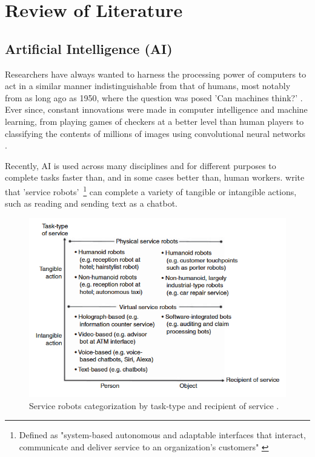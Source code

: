 \documentclass[12pt]{report}
\begin{document}
    \pagebreak %

    \section{Review of Literature}

    \subsection{Artificial Intelligence (AI)}


    Researchers have always wanted to harness the processing power of computers to act in a similar manner 
    indistinguishable from that of humans, most notably from as long ago as 1950, where the question was posed 
    'Can machines think?' \autocite{turing_icomputing_1950}. Ever since, constant innovations were made in computer 
    intelligence and machine learning, from playing games of checkers at a better level than human players \autocite{samuel_studies_1959}
    to classifying the contents of millions of images using convolutional neural networks \autocite{krizhevsky_imagenet_2012}.


    Recently, AI is used across many disciplines and for different purposes to complete tasks faster than, and in some cases better than,
    human workers. \textcite{wirtz_brave_2018} write that 'service robots'~\footnote{Defined as "system-based autonomous and adaptable interfaces that 
    interact, communicate and deliver service to an organization’s customers" \autocite[p.909]{wirtz_brave_2018}} can complete a variety of 
    tangible or intangible actions, such as reading and sending text as a chatbot.
    
    \begin{figure}[H]
        \centering
        \includegraphics[width=.8\linewidth]{serviceBots.png}
        \caption{Service robots categorization by task-type and recipient of service \autocite{wirtz_brave_2018}.}
        \label{fig:serviceBots}
    \end{figure}
\end{document}
